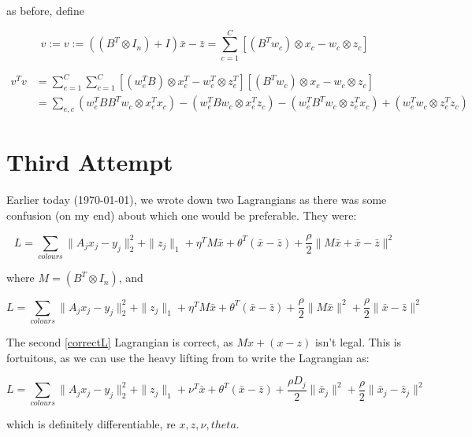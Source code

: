 \documentclass{article}
\begin{document}
as before, define

\begin{equation}
v := v := \left(\left(B^T \otimes I_n\right)+I\right)\bar{x} - \bar{z} = \sum_{c=1}^C \left[\left(B^Tw_c\right)\otimes x_c - w_c\otimes z_c\right]
\end{equation}

\begin{align*}
v^Tv &= \sum_{e=1}^C \sum_{c=1}^C \left[\left(w_e^TB\right)\otimes x_e^T - w_e^T\otimes z_e^T\right]  \left[\left(B^Tw_c\right)\otimes x_c - w_c\otimes z_c\right] \\
&= \sum_{e,c} \left(w_e^TBB^Tw_c \otimes x_e^Tx_c\right) - \left(w_e^TBw_c \otimes x_e^Tz_c\right) - \left(w_e^T B^Tw_c \otimes z_e^T x_c\right) + \left(w_e^T w_c \otimes z_e^T z_c\right)
\end{align*}

\section{Third Attempt}

Earlier today (\today), we wrote down two Lagrangians as there was some confusion (on my end) about which one would be preferable. They were:

\begin{equation}
L = \sum_{colours} \|A_jx_j - y_j\|_2^2 + \|z_j\|_1 + \eta^T M \bar{x} +\theta^T\left(\bar{x} - \bar{z}\right) + \frac{\rho}{2}\|M\bar{x} + \bar{x} - \bar{z}\|^2
\end{equation} 

where \(M = \left(B^T \otimes I_n\right)\), and 

\begin{equation}
L = \sum_{colours} \|A_jx_j - y_j\|_2^2 + \|z_j\|_1 + \eta^T M \bar{x} +\theta^T\left(\bar{x} - \bar{z}\right) + \frac{\rho}{2}\|M\bar{x}\|^2 + \frac{\rho}{2}\|\bar{x} - \bar{z}\|^2
\label{correctL}
\end{equation} 

The second \eqref{correctL} Lagrangian is correct, as \(Mx+(x-z)\) isn't legal. This is fortuitous, as we can use the heavy lifting from \cite{mota2013d} to write the Lagrangian as:

\begin{equation}
L = \sum_{colours} \|A_jx_j - y_j\|_2^2 + \|z_j\|_1 + \nu^T \bar{x} +\theta^T\left(\bar{x} - \bar{z}\right) + \frac{\rho D_j}{2}\|\bar{x}_j\|^2 + \frac{\rho}{2}\|\bar{x}_j - \bar{z}_j\|^2
\end{equation}

which is definitely differentiable, re \(x,z,\nu,theta\).




\end{document}
